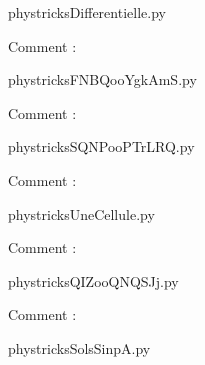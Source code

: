     \newcommand{\CaptionFigDifferentielle}{<+Type your caption here+>}
    \begin{center}
        
    \end{center}
    phystricksDifferentielle.py

    Comment : 

    \clearpage
    


    \newcommand{\CaptionFigFNBQooYgkAmS}{<+Type your caption here+>}
    \begin{center}
        
    \end{center}
    phystricksFNBQooYgkAmS.py

    Comment : 

    \clearpage
    


    \newcommand{\CaptionFigSQNPooPTrLRQ}{<+Type your caption here+>}
    \begin{center}
        
    \end{center}
    phystricksSQNPooPTrLRQ.py

    Comment : 

    \clearpage
    


    \newcommand{\CaptionFigUneCellule}{<+Type your caption here+>}
    \begin{center}
        
    \end{center}
    phystricksUneCellule.py

    Comment : 

    \clearpage
    


    \newcommand{\CaptionFigQIZooQNQSJj}{<+Type your caption here+>}
    \begin{center}
        
    \end{center}
    phystricksQIZooQNQSJj.py

    Comment : 

    \clearpage
    


    \newcommand{\CaptionFigSolsSinpA}{<+Type your caption here+>}
    \begin{center}
        
    \end{center}
    phystricksSolsSinpA.py

